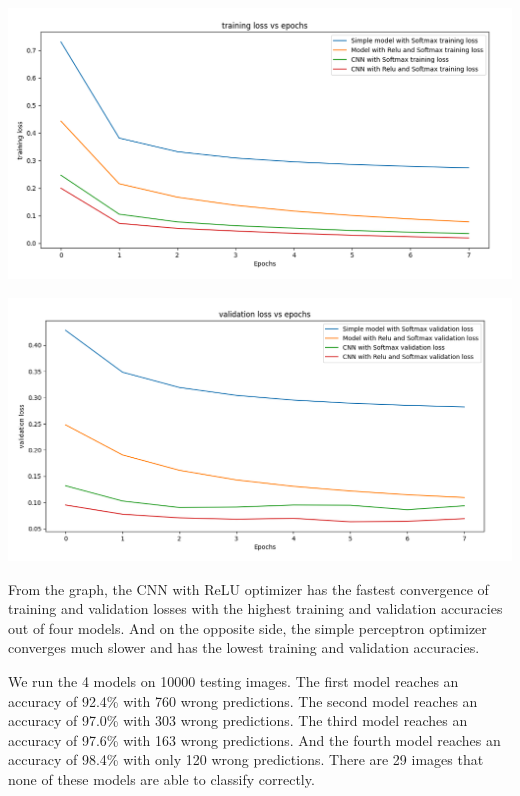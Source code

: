 \documentclass{article}
\begin{document}
\hspace{-0.3in}
\begin{minipage}{0.52\linewidth}
\includegraphics[width = \linewidth]{Training_loss.png}
\end{minipage}
\begin{minipage}{0.52\linewidth}
\includegraphics[width = \linewidth]{Validation_loss.png}
\end{minipage}
\smallskip

From the graph, the CNN with ReLU optimizer has the fastest convergence of training and validation losses with the highest training and validation accuracies out of four models. And on the opposite side, the simple perceptron optimizer converges much slower and has the lowest training and validation accuracies.

We run the 4 models on 10000 testing images. The first model reaches an accuracy of 92.4\% with 760 wrong predictions. The second model
reaches an accuracy of 97.0\% with 303 wrong predictions. The third model reaches an accuracy of 97.6\% with 163 wrong predictions. And the fourth  model reaches an accuracy of 98.4\% with only 120 wrong predictions. There are 29 images that none of these models are able to classify correctly.
\end{document}
